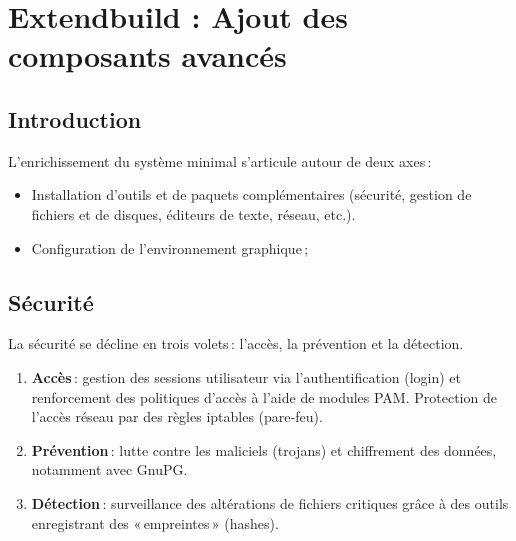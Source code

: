 
\chapter{  Extendbuild : Ajout des composants avancés}
\minitoc
\clearpage

\section{Introduction}
L’enrichissement du système minimal s’articule autour de deux axes :

\begin{itemize}
 
  \item Installation d’outils et de paquets complémentaires (sécurité, gestion de fichiers et de disques, éditeurs de texte, réseau, etc.).
  \item Configuration de l’environnement graphique ;  
\end{itemize}

\section{Sécurité}
La sécurité se décline en trois volets : l’accès, la prévention et la détection.

\begin{enumerate}
  \item \textbf{Accès} : gestion des sessions utilisateur via l’authentification (login) et renforcement des politiques d’accès à l’aide de modules PAM. Protection de l’accès réseau par des règles iptables (pare‑feu).
  \item \textbf{Prévention} : lutte contre les maliciels (trojans) et chiffrement des données, notamment avec GnuPG.
  \item \textbf{Détection} : surveillance des altérations de fichiers critiques grâce à des outils enregistrant des « empreintes » (hashes).
\end{enumerate}

